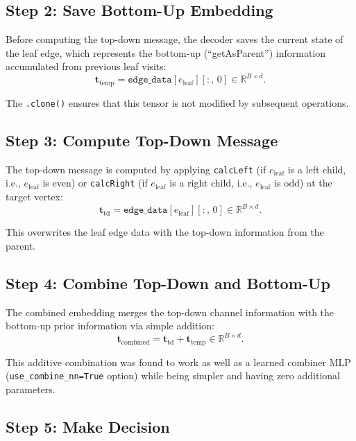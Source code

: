 \documentclass[11pt,a4paper]{article}
\newcommand{\R}{\mathbb{R}}
\begin{document}
\subsection{Step 2: Save Bottom-Up Embedding}

Before computing the top-down message, the decoder saves the current state of the leaf edge, which represents the bottom-up (``getAsParent'') information accumulated from previous leaf visits:
\begin{equation}
    \bm{t}_{\text{temp}} = \texttt{edge\_data}[e_{\text{leaf}}][:,\, 0] \in \R^{B \times d}.
    \label{eq:save_temp}
\end{equation}

The \texttt{.clone()} ensures that this tensor is not modified by subsequent operations.

\subsection{Step 3: Compute Top-Down Message}

The top-down message is computed by applying \texttt{calcLeft} (if $e_{\text{leaf}}$ is a left child, i.e., $e_{\text{leaf}}$ is even) or \texttt{calcRight} (if $e_{\text{leaf}}$ is a right child, i.e., $e_{\text{leaf}}$ is odd) at the target vertex:
\begin{equation}
    \bm{t}_{\text{td}} = \texttt{edge\_data}[e_{\text{leaf}}][:,\, 0] \in \R^{B \times d}.
\end{equation}

This overwrites the leaf edge data with the top-down information from the parent.

\subsection{Step 4: Combine Top-Down and Bottom-Up}

The combined embedding merges the top-down channel information with the bottom-up prior information via simple addition:
\begin{equation}
    \bm{t}_{\text{combined}} = \bm{t}_{\text{td}} + \bm{t}_{\text{temp}} \in \R^{B \times d}.
    \label{eq:combine}
\end{equation}

This additive combination was found to work as well as a learned combiner MLP (\texttt{use\_combine\_nn=True} option) while being simpler and having zero additional parameters.

\subsection{Step 5: Make Decision}
\end{document}
